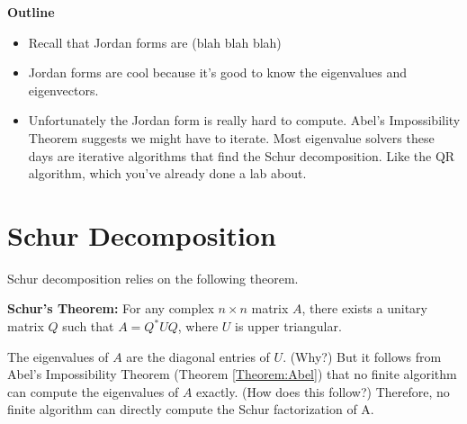\label{lab:Jordan}



\textbf{Outline}
\begin{itemize}
	\item Recall that Jordan forms are (blah blah blah)
	\item Jordan forms are cool because it's good to know the eigenvalues and eigenvectors. 
	\item Unfortunately the Jordan form is really hard to compute. Abel's Impossibility Theorem suggests we might have to iterate. Most eigenvalue solvers these days are iterative algorithms that find the Schur decomposition. Like the QR algorithm, which you've already done a lab about.

\end{itemize}

\section*{Schur Decomposition}
Schur decomposition relies on the following theorem.


\begin{theorem}
{\bf Schur's Theorem:} For any complex $n \times n$ matrix $A$, there exists a unitary matrix $Q$ such that $A = Q^\ast U Q$, where $U$ is upper triangular.
\end{theorem}


The eigenvalues of $A$ are the diagonal entries of $U$. (Why?) But it follows from Abel's Impossibility Theorem (Theorem \ref{Theorem:Abel}) that no finite algorithm can compute the eigenvalues of $A$ exactly. (How does this follow?) Therefore, no finite algorithm can directly compute the Schur factorization of A.
